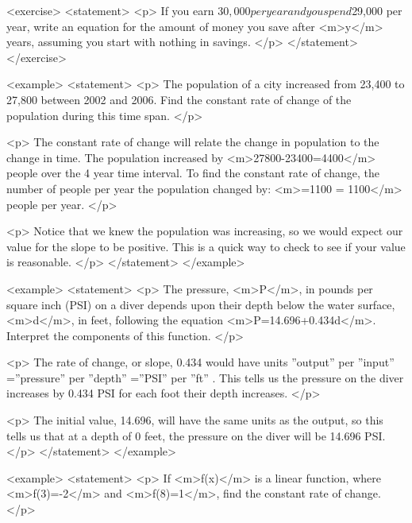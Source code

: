     <exercise>
        <statement>
            <p>
                If you earn $30,000 per year and you spend $29,000 per year, write an equation for the amount of money you save after <m>y</m> years, assuming you start with nothing in savings.
            </p>
        </statement>
    </exercise>

    <example>
        <statement>
            <p>
                The population of a city increased from 23,400 to 27,800 between 2002 and 2006.
                Find the constant rate of change of the population during this time span.
            </p>

            <p>
                The constant rate of change will relate the change in population to the change in time.
                The population increased by <m>27800-23400=4400</m> people over the 4 year time interval.
                To find the constant rate of change, the number of people per year the population changed by: <m>=1100 = 1100</m> people per year.
            </p>

            <p>
                Notice that we knew the population was increasing, so we would expect our value for the slope to be positive.
                This is a quick way to check to see if your value is reasonable.
            </p>
        </statement>
    </example>

    <example>
        <statement>
            <p>
                The pressure, <m>P</m>, in pounds per square inch (PSI) on a diver depends upon their depth below the water surface, <m>d</m>, in feet, following the equation <m>P=14.696+0.434d</m>.
                Interpret the components of this function.
            </p>

            <p>
                The rate of change, or slope, 0.434 would have units ”output” per ”input” =”pressure” per ”depth” =”PSI” per ”ft” .
                This tells us the pressure on the diver increases by 0.434 PSI for each foot their depth increases.
            </p>

            <p>
                The initial value, 14.696, will have the same units as the output, so this tells us that at a depth of 0 feet, the pressure on the diver will be 14.696 PSI.
            </p>
        </statement>
    </example>

    <example>
        <statement>
            <p>
                If <m>f(x)</m> is a linear function, where <m>f(3)=-2</m> and <m>f(8)=1</m>, find the constant rate of change.
            </p>

